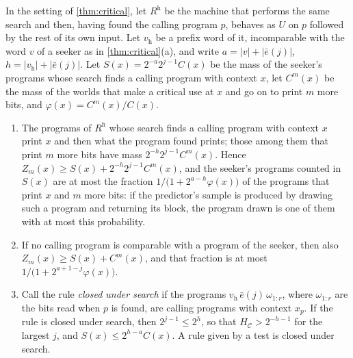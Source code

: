 \begin{proposition}\label{prop:honest}
In the setting of \cref{thm:critical}, let $R^{\mathrm h}$ be the machine that performs the same search and
then, having found the calling program $p$, behaves as $U$ on $p$ followed by the rest of its own input. Let
$v_{\mathrm h}$ be a prefix word of it, incomparable with the word $v$ of a seeker as in
\cref{thm:critical}(a), and write $a=|v|+|\bar e(j)|$, $h=|v_{\mathrm h}|+|\bar e(j)|$. Let
$S(x)=2^{-a}2^{j-1}C(x)$ be the mass of the seeker's programs whose search finds a calling program with
context $x$, let $C^m(x)$ be the mass of the worlds that make a critical use at $x$ and go on to print $m$
more bits, and $\varphi(x)=C^m(x)/C(x)$.
\begin{enumerate}[label=(\alph*),leftmargin=2em,itemsep=2pt,topsep=2pt]
\item The programs of $R^{\mathrm h}$ whose search finds a calling program with context $x$ print $x$ and then
what the program found prints; those among them that print $m$ more bits have mass $2^{-h}2^{j-1}C^m(x)$.
Hence $Z_m(x)\ge S(x)+2^{-h}2^{j-1}C^m(x)$, and the seeker's programs counted in $S(x)$ are at most the
fraction $1/\bigl(1+2^{a-h}\varphi(x)\bigr)$ of the programs that print $x$ and $m$ more bits: if the
predictor's sample is produced by drawing such a program and returning its block, the program drawn is one of
them with at most this probability.
\item If no calling program is comparable with a program of the seeker, then also $Z_m(x)\ge S(x)+C^m(x)$,
and that fraction is at most $1/\bigl(1+2^{a+1-j}\varphi(x)\bigr)$.
\item Call the rule \emph{closed under search} if the programs $v_{\mathrm h}\,\bar e(j)\,\omega_{1:r}$, where
$\omega_{1:r}$ are the bits read when $p$ is found, are calling programs with context $x_p$. If the rule is
closed under search, then $2^{j-1}\le2^{h}$, so that $H_{\mathcal C}>2^{-h-1}$ for the largest $j$, and
$S(x)\le2^{h-a}C(x)$. A rule given by a test is closed under search.
\end{enumerate}
\end{proposition}
